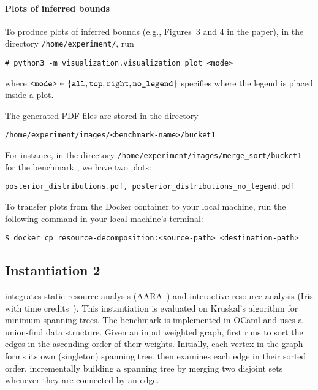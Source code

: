 \paragraph{Plots of inferred bounds}

To produce plots of inferred bounds (e.g., Figures~3 and 4 in the paper), in the
directory \texttt{/home/experiment/}, run
\begin{verbatim}
# python3 -m visualization.visualization plot <mode>
\end{verbatim}
where $\texttt{<mode>} \in \{ {\texttt{all}, \texttt{top}, \texttt{right},
    \texttt{no\_legend}} \}$ specifies where the legend is placed inside a plot.

The generated PDF files are stored in the directory
\begin{verbatim}
/home/experiment/images/<benchmark-name>/bucket1
\end{verbatim}
%
For instance, in the directory \texttt{/home/experiment/images/merge\_sort/bucket1}
for the benchmark \mergesort{}, we have two plots:
\begin{verbatim}
posterior_distributions.pdf, posterior_distributions_no_legend.pdf
\end{verbatim}

To transfer plots from the Docker container to your local machine, run the
following command in your local machine's terminal:
\begin{verbatim}
$ docker cp resource-decomposition:<source-path> <destination-path>
\end{verbatim}

\subsection{Instantiation 2}
\label{sec:step-by-step-instructions:instantiation-2}

 integrates static resource analysis
(AARA~\citep{Hoffmann2011a,Hoffmann2017}) and interactive resource analysis
(Iris with time credits~\citep{Chargueraud2019}).
%
This instantiation is evaluated on Kruskal's algorithm for minimum spanning
trees.
%
The benchmark \kruskal{} is implemented in OCaml and uses a union-find data
structure.
%
Given an input weighted graph, \kruskal{} first runs \mergesort{} to sort the
edges in the ascending order of their weights.
%
Initially, each vertex in the graph forms its own (singleton) spanning tree.
%
\kruskal{} then examines each edge in their sorted order, incrementally building
a spanning tree by merging two disjoint sets whenever they are connected by an
edge.

